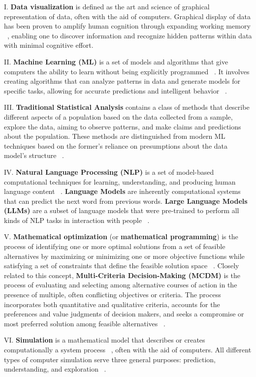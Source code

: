 \documentclass{sfuthesis}
\begin{document}
I.	\textbf{Data visualization} is defined as the art and science of graphical representation of data, often with the aid of computers. Graphical display of data has been proven to amplify human cognition through expanding working memory ~\cite{card1999readings}, enabling one to discover information and recognize hidden patterns within data with minimal cognitive effort.\par
II.	\textbf{Machine Learning (ML)} is a set of models and algorithms that give computers the ability to learn without being explicitly programmed ~\cite{samuel1959some}. It involves creating algorithms that can analyze patterns in data and generate models for specific tasks, allowing for accurate predictions and intelligent behavior ~\cite{francca2021overview}.\par
III.\textbf{ Traditional Statistical Analysis} contains a class of methods that describe different aspects of a population based on the data collected from a sample, explore the data, aiming to observe patterns, and make claims and predictions about the population. These methods are distinguished from modern ML techniques based on the former’s reliance on presumptions about the data model’s structure ~\cite{bennett2022similarities}.\par
IV. \textbf{Natural Language Processing (NLP)} is a set of model-based computational techniques for learning, understanding, and producing human language content ~\cite{hirschberg2015advances}. \textbf{Language Models} are inherently computational systems that can predict the next word from previous words.\textbf{ Large Language Models (LLMs)} are a subset of language models that were pre-trained to perform all kinds of NLP tasks in interaction with people ~\cite{jurafsky2000speech}.\par
V.\textbf{ Mathematical optimization} (or \textbf{mathematical programming}) is the process of identifying one or more optimal solutions from a set of feasible alternatives by maximizing or minimizing one or more objective functions while satisfying a set of constraints that define the feasible solution space ~\cite{intriligator2002mathematical, floudas2008encyclopedia}. Closely related to this concept,\textbf{ Multi-Criteria Decision-Making (MCDM)} is the process of evaluating and selecting among alternative courses of action in the presence of multiple, often conflicting objectives or criteria. The process incorporates both quantitative and qualitative criteria, accounts for the preferences and value judgments of decision makers, and seeks a compromise or most preferred solution among feasible alternatives ~\cite{belton2012multiple, kahraman2015fuzzy}.\par
VI. \textbf{Simulation} is a mathematical model that describes or creates computationally a system process ~\cite{vallverdu2014simulations}, often with the aid of computers. All different types of computer simulation serve three general purposes: prediction, understanding, and exploration ~\cite{winsberg2013computer}.
\end{document}
